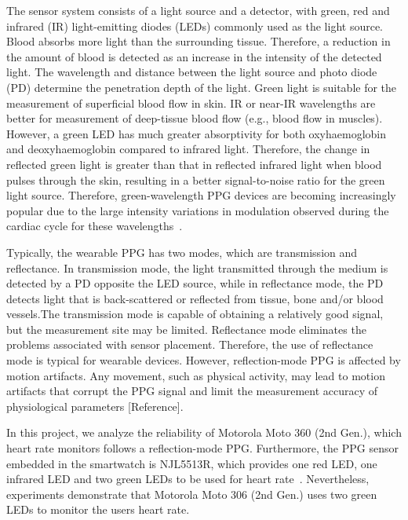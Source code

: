 \documentclass[11pt, draftclsnofoot, onecolumn]{IEEEtran}
\begin{document}
    The sensor system consists of a light source and a detector, with green, red and infrared (IR) light-emitting diodes (LEDs) commonly used as the light source. Blood absorbs more light than the surrounding tissue. Therefore, a reduction in the amount of blood is detected as an increase in the intensity of the detected light. The wavelength and distance between the light source and photo diode (PD) determine the penetration depth of the light. Green light is suitable for the measurement of superficial blood flow in skin. IR or near-IR wavelengths are better for measurement of deep-tissue blood flow (e.g., blood flow in muscles). However, a green LED has much greater absorptivity for both oxyhaemoglobin and deoxyhaemoglobin compared to infrared light. Therefore, the change in reflected green light is greater than that in reflected infrared light when blood pulses through the skin, resulting in a better signal-to-noise ratio for the green light source. Therefore, green-wavelength PPG devices are becoming increasingly popular due to the large intensity variations in modulation observed during the cardiac cycle for these wavelengths~\cite{lee2013comparison}.
    
    Typically, the wearable PPG has two modes, which are transmission and reflectance. In transmission mode, the light transmitted through the medium is detected by a PD opposite the LED source, while in reflectance mode, the PD detects light that is back-scattered or reflected from tissue, bone and/or blood vessels.The transmission mode is capable of obtaining a relatively good signal, but the measurement site may be limited. Reflectance mode eliminates the problems associated with sensor placement. Therefore, the use of reflectance mode is typical for wearable devices. However, reflection-mode PPG is affected by motion artifacts. Any movement, such as physical activity, may lead to motion artifacts that corrupt the PPG signal and limit the measurement accuracy of physiological parameters [Reference].
    
    In this project, we analyze the reliability of Motorola Moto 360 (2nd Gen.), which heart rate monitors follows a reflection-mode PPG. Furthermore, the PPG sensor embedded in the smartwatch is NJL5513R, which provides one red LED, one infrared LED and two green LEDs to be used for heart rate~\cite{NJL5513Rdatasheet}. Nevertheless, experiments demonstrate that Motorola Moto 306 (2nd Gen.) uses two green LEDs to monitor the users heart rate.
    
    
\end{document}
